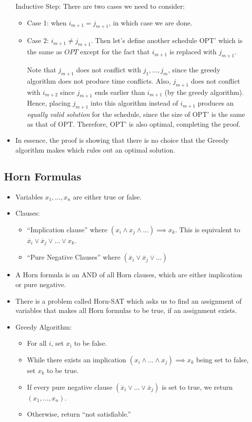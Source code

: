 \begin{itemize}
			Inductive Step: There are two cases we need to consider:
			\begin{itemize}
				\item Case 1: when $i_{m+1} = j_{m+1}$, in which case we are done.
				\item Case 2: $i_{m+1} \neq j_{m+1}$. Then let's define another schedule OPT' which is 
					the same as $OPT$ except for the fact that $i_{m+1}$ is replaced with $j_{m+1}$. 

					Note that $j_{m+1}$ does not conflict with $j_1, \dots, j_m$, since the greedy algorithm does
					not produce time conflicts. 
					Also, $j_{m+1}$ does not conflict with 
					$i_{m+2}$ since $j_{m+1}$ ends earlier than $i_{m+1}$ (by the greedy algorithm). Hence, 
					placing $j_{m+1}$ into this algorithm instead of $i_{m+1}$ produces an \textit{equally 
					valid solution} for the schedule, since the size of OPT' is the same as that of OPT. 
					Therefore, OPT' is also optimal, completing the proof.
			\end{itemize}
		\item In essence, the proof is showing that there is no choice that the Greedy algorithm makes which 
			rules out an optimal solution. 
	\end{itemize}
	\subsection{Horn Formulas}
	\begin{itemize}
		\item Variables $x_1, \dots, x_n$ are either true or false.  
		\item Clauses: 
			\begin{itemize}
				\item ``Implication clause'' where $(x_i \land x_j \land \dots) \implies x_k$. This is 
					equivalent to $\overline x_i \lor \overline x_j \lor \dots \lor x_k$.
				\item ``Pure Negative Clauses'' where $(\overline x_i \lor \overline x_j \lor \dots )$
			\end{itemize}
		\item A Horn formula is an AND of all Horn clauses, which are either implication or pure negative.
		\item There is a problem called Horn-SAT which asks us to find an assignment of variables that makes
			all Horn formulas to be true, if an assignment exists.
		\item Greedy Algorithm: 
			\begin{itemize}
				\item For all $i$, set $x_i$ to be false. 
				\item While there exists an implication $(x_i \land \dots \land x_j) \implies x_k$ being 
					set to false, set $x_k$ to be true. 
				\item If every pure negative clause $(\overline x_i \lor \dots \lor \overline x_j)$ is 
					set to true, we return $(x_1, \dots, x_n)$. 
				\item Otherwise, return ``not satisfiable.''
			\end{itemize}
	\end{itemize}
